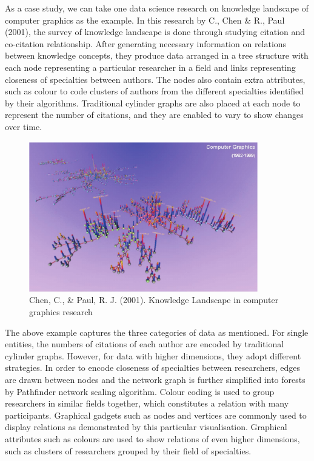 \documentclass[11pt, a4paper]{report}
\begin{document}
As a case study, we can take one data science research on knowledge landscape of computer graphics as the example. In this research by C., Chen \& R., Paul (2001), the survey of knowledge landscape is done through studying citation and co-citation relationship. After generating necessary information on relations between knowledge concepts, they produce data arranged in a tree structure with each node representing a particular researcher in a field and links representing closeness of specialties between authors. The nodes also contain extra attributes, such as colour to code clusters of authors from the different specialties identified by their algorithms. Traditional cylinder graphs are also placed at each node to represent the number of citations, and they are enabled to vary to show changes over time.\\
\begin{figure}[H]
\centering
\includegraphics[width=10cm]{fig2_knowledge_landscape}
\caption{Chen, C., \& Paul, R. J. (2001). Knowledge Landscape in computer graphics research}
\end{figure}

The above example captures the three categories of data as mentioned. For single entities, the numbers of citations of each author are encoded by traditional cylinder graphs. However, for data with higher dimensions, they adopt different strategies. In order to encode closeness of specialties between researchers, edges are drawn between nodes and the network graph is further simplified into forests by Pathfinder network scaling algorithm. Colour coding is used to group researchers in similar fields together, which constitutes a relation with many participants. Graphical gadgets such as nodes and vertices are commonly used to display relations as demonstrated by this particular visualisation. Graphical attributes such as colours are used to show relations of even higher dimensions, such as clusters of researchers grouped by their field of specialties.
\end{document}
